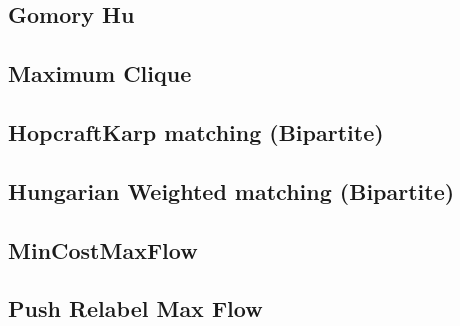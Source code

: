 \subsection{Gomory Hu}
\vspace{-2.3ex}
\raggedbottom
\vspace{-3.3ex}
\hrulefill
\vspace{-1ex}
\subsection{Maximum Clique}
\vspace{-2.3ex}
\raggedbottom
\vspace{-3.3ex}
\hrulefill
\vspace{-1ex}
\subsection{HopcraftKarp matching (Bipartite)}
\vspace{-2.3ex}
\raggedbottom
\vspace{-3.3ex}
\hrulefill
\vspace{-1ex}
\subsection{Hungarian Weighted matching (Bipartite)}
\vspace{-2.3ex}
\raggedbottom
\vspace{-3.3ex}
\hrulefill
\vspace{-1ex}
\subsection{MinCostMaxFlow}
\vspace{-2.3ex}
\raggedbottom
\vspace{-3.3ex}
\hrulefill
\vspace{-1ex}
\subsection{Push Relabel Max Flow}
\vspace{-2.3ex}
\raggedbottom
\vspace{-3.3ex}
\hrulefill
\vspace{-1ex}
